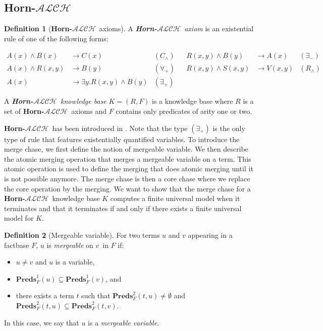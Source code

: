 \documentclass{article}
\theoremstyle{definition}
\newtheorem{definition}{Definition}[section]
\theoremstyle{remark}
\newcommand{\Preds}{\textbf{Preds}}
\newcommand{\ALCH}{\textbf{Horn-$\mathcal{ALCH}$}}
\begin{document}
\subsection{\ALCH }

\begin{definition}[\ALCH\ axioms]
A \emph{\ALCH\ axiom} is an existential rule of one of the following forms:

\begin{align*}
A(x) \wedge B(x) &\rightarrow C(x) & (C_\wedge)&& R(x,y) \wedge B(y) &\rightarrow A(x) & (\exists_-) \\
A(x) \wedge R(x,y) &\rightarrow B(y)  & (\forall_+) && R(x,y) \wedge S(x,y) &\rightarrow V(x,y) & (R_\wedge)\\
A(x) &\rightarrow \exists y.R(x,y) \wedge B(y) & (\exists_+)  
\end{align*}



A \emph{\ALCH\ knowledge base} $K = (R,F)$ is a knowledge base where $R$ is a set of \ALCH\ axioms and $F$ contains only predicates of arity one or two. 

\end{definition}

\ALCH\ has been introduced in \cite{Horn-ALC}. Note that the type $(\exists_+)$ is the only type of rule that features existentially quantified variables. To introduce the merge chase, we first define the notion of mergeable variable. We then describe the atomic merging operation that merges a mergeable variable on a term. This atomic operation is used to define the merging that does atomic merging until it is not possible anymore. The merge chase is then a core chase where we replace the core operation by the merging. We want to show that the merge chase for a \ALCH\ knowledge base $K$ computes a finite universal model when it terminates and that it terminates if and only if there exists a finite universal model for $K$. 

\begin{definition}[Mergeable variable]
For two terms $u$ and $v$ appearing in a factbase $F$, $u$ is \emph{mergeable} on $v$\ in $F$ if:
\begin{itemize}
\item $u \neq v$ and $u$ is a variable,
\item $\Preds_{F}^1(u) \subseteq \Preds_{F}^1(v)$, and
\item there exists a term $t$ such that $\Preds^2_{F}(t,u) \neq \emptyset$ and $\Preds_{F}^2(t,u) \subseteq \Preds_{F}^2(t,v)$.
\end{itemize}
In this case, we say that $u$ is a \emph{mergeable variable}.
\end{definition}
\end{document}
